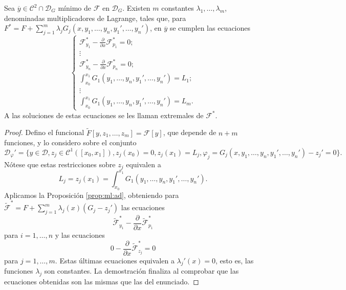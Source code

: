 \documentclass{article}
\begin{document}
\begin{thm} \label{thm:el:ri} Sea
  $\overline{y} \in \mathcal{C}^2 \cap \mathcal{D}_G$ mínimo de $\mathcal{F}$ en
  $\mathcal{D}_G$. Existen $m$ constantes $\lambda_1, \ldots, \lambda_m$, denominadas
  multiplicadores de Lagrange, tales que, para
  $F^* = F + \sum_{j = 1}^m \lambda_j G_j(x, y_1, \ldots, y_n, y_1', \ldots, y_n')$, en
  $\overline{y}$ se cumplen las ecuaciones
  \[
    \begin{cases}
      \mathcal{F}_{y_1}^* - \frac{\partial}{\partial x} \mathcal{F}_{p_1}^* = 0; \\
      \vdots \\
      \mathcal{F}_{y_n}^* - \frac{\partial}{\partial x} \mathcal{F}_{p_n}^* = 0; \\
      \int_{x_0}^{x_1} G_1(y_1, \dots, y_n, y_1', \ldots, y_n') = L_1; \\
      \vdots \\
      \int_{x_0}^{x_1} G_1(y_1, \dots, y_n, y_1', \ldots, y_n') = L_m.
    \end{cases}
  \]
  A las soluciones de estas ecuaciones se les llaman extremales de $\mathcal{F}^*$.
\end{thm}
\begin{proof}
  Defino el funcional $\widetilde{F}[y, z_1, \ldots, z_m] = \mathcal{F}[y]$, que depende de $n+m$
  funciones, y lo considero sobre el conjunto
  \[\mathcal{D}_\varphi' = \{y \in \mathcal{D}, z_j \in \mathcal{C}^1([x_0,x_1]), z_j(x_0) = 0,
    z_j(x_1) = L_j, \varphi_j = G_j(x, y_1, \ldots, y_n, y_1', \ldots, y_n') - z_j'= 0\}.\] Nótese
  que estas restricciones sobre $z_j$ equivalen a
  \[L_j = z_j(x_1) = \int_{x_0}^{x_1} G_1(y_1, \dots, y_n, y_1', \ldots, y_n').\] Aplicamos la
  Proposición \ref{prop:ml:ad}, obteniendo para
  $\widetilde{\mathcal{F}}^* = F + \sum_{j = 1}^m \lambda_j(x)(G_j - z_j')$ las ecuaciones
  \[\widetilde{\mathcal{F}}_{y_1}^* - \frac{\partial}{\partial x} \widetilde{\mathcal{F}}_{p_1}^*\]
  para $i = 1, \ldots, n$ y las ecuaciones
  \[0 - \frac{\partial}{\partial x} \widetilde{\mathcal{F}}_{z_j}^* = 0\] para $j = 1, \ldots,
  m$. Estas últimas ecuaciones equivalen a $\lambda_j'(x) = 0$, esto es, las funciones $\lambda_j$
  son constantes. La demostración finaliza al comprobar que las ecuaciones obtenidas son las mismas
  que las del enunciado.
\end{proof}
\end{document}
